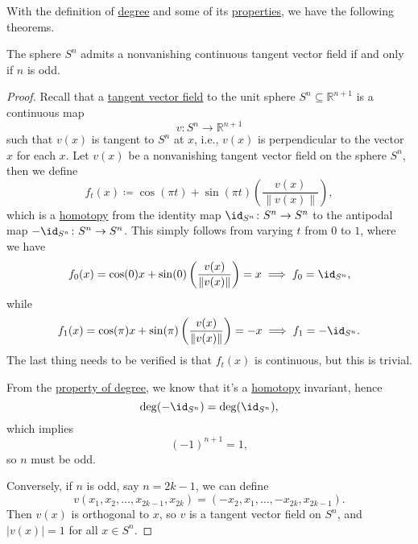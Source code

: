 With the definition of \hyperref[def:degree]{degree} and some of its \hyperref[rmk:property-of-degree]{properties}, we have the following theorems.

\begin{theorem}\label{thm:hairy-ball-theorem}
	The sphere \(S^n\) admits a nonvanishing continuous tangent vector field if and only if \(n\) is odd.
\end{theorem}
\begin{proof}
	Recall that a \underline{tangent vector field} to the unit sphere \(S^n\subseteq \mathbb{R} ^{n+1}\) is a continuous map
	\[
		v \colon S^n \to \mathbb{R} ^{n+1}
	\]
	such that \(v(x)\) is tangent to \(S^n\) at \(x\), i.e., \(v(x)\) is perpendicular to the vector \(x\) for each \(x\). Let \(v(x)\) be a nonvanishing tangent vector field on the sphere \(S^n\), then we define
	\[
		f_t(x) \coloneqq \cos (\pi t) + \sin (\pi t)\left(\frac{v(x)}{\left\lVert v(x)\right\rVert }\right),
	\]
	which is a \hyperref[def:homotopy]{homotopy} from the identity map \(\id_{S^n}\colon S^n \to S^n \) to the antipodal map
	\(-\id_{S^n}\colon S^{n}\to S^n\). This simply follows from varying \(t\) from \(0\) to \(1\), where we have
	\[
		f_0(x) = \cos (0) x + \sin (0) \left(\frac{v(x)}{\left\lVert v(x)\right\rVert }\right) = x \implies f_0 = \id_{S^n} ,
	\]
	while
	\[
		f_1(x) = \cos (\pi )x + \sin (\pi )\left(\frac{v(x)}{\left\lVert v(x)\right\rVert }\right) = - x \implies f_{1} = - \id_{S^n}.
	\]
	The last thing needs to be verified is that \(f_t(x)\) is continuous, but this is trivial.

	From the \hyperref[rmk:property-of-degree]{property of degree}, we know that it's a \hyperref[def:homotopy]{homotopy} invariant, hence
	\[
		\deg (-\id_{S^n}) = \deg (\id_{S^n} ),
	\]
	which implies
	\[
		(-1)^{n+1} = 1,
	\]
	so \(n\) must be odd.

	Conversely, if \(n\) is odd, say \(n=2k-1\), we can define
	\[
		v(x_1, x_2, \dots , x_{2k-1}, x_{2k})= (-x_2, x_1, \dots , -x_{2k}, x_{2k-1}).
	\]
	Then \(v(x)\) is orthogonal to \(x\), so \(v\) is a tangent vector field on \(S^n\), and \(\left\vert v(x) \right\vert = 1\) for all \(x\in S^n\).
\end{proof}

